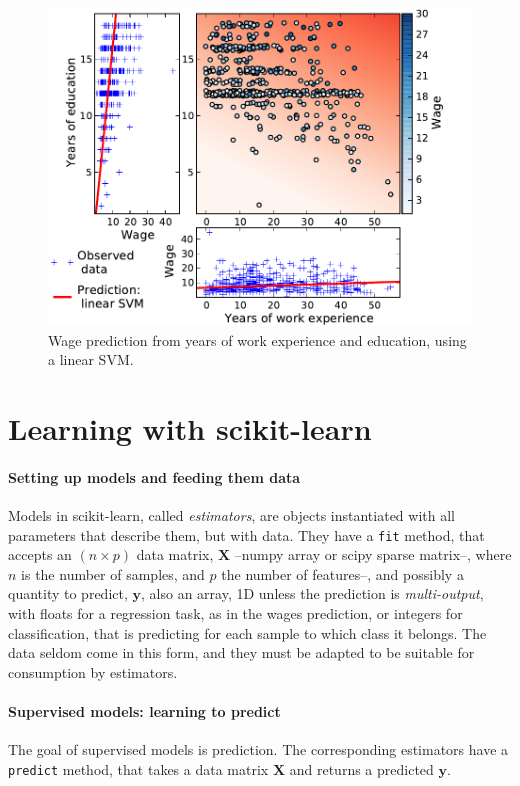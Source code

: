 \documentclass[a4paper]{article}
\begin{document}
\begin{figure}[b]
    \hspace*{-.015\linewidth}%
    \includegraphics[width=1.05\linewidth]{wage_data_linear_svm}%

    \caption{Wage prediction from years of work experience and education,
    using a linear SVM.\label{fig:linear_svm}}
\end{figure}

\section{Learning with scikit-learn}

\paragraph{Setting up models and feeding them data}
%
Models in scikit-learn, called \emph{estimators}, are objects
instantiated with all parameters that describe them, but with data. They
have a {\tt fit} method, that accepts an $(n \times p)$ data matrix,
$\mathbf{X}$ --numpy array or scipy sparse matrix--, where $n$ is the
number of samples, and $p$ the number of features--, and possibly a
quantity to predict, $\mathbf{y}$, also an array, 1D unless the
prediction is \emph{multi-output}, with floats for a regression task, as
in the wages prediction, or integers for classification, that is
predicting for each sample to which class it belongs. The data seldom
come in this form, and they must be adapted to be suitable for
consumption by estimators.

\paragraph{Supervised models: learning to predict}
%
The goal of supervised models is prediction. The corresponding estimators
have a {\tt predict} method, that takes a data matrix $\mathbf{X}$ and
returns a predicted $\mathbf{y}$.
\end{document}
